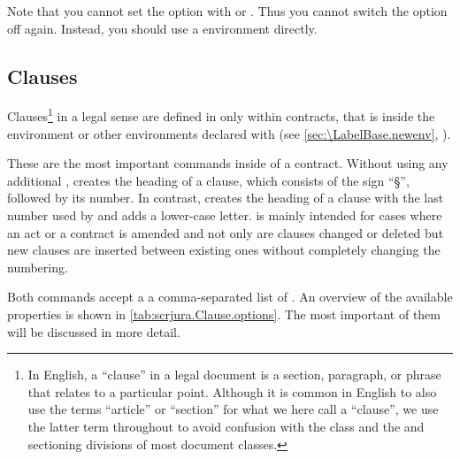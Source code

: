 Note that you cannot set the  option
with  or
. Thus you cannot switch the option off
again. Instead, you should use a  environment
directly.%
\EndIndexGroup


\subsection{Clauses}
\label{sec:scrjura.clause}

Clauses\footnote{%
  In English, a ``clause'' in a legal document is a section, paragraph, or
  phrase that relates to a particular point. Although it is common in English
  to also use the terms ``article'' or ``section'' for what we here call a
  ``clause'', we use the latter term throughout to avoid confusion with the
   class and the  and
   sectioning divisions of most document
  classes.} in a legal sense are defined in  only within
contracts, that is inside the  environment or
other environments declared with
 (see
\autoref{sec:\LabelBase.newenv},
).

\begin{Declaration}
\end{Declaration}
These are the most important commands inside of a contract. Without using any
additional ,  creates the heading of a clause,
which consists of the sign ``\S'', followed by its number. In contrast,
 creates the heading of a clause with the last number used by
 and adds a lower-case letter.  is mainly
intended for cases where an act or a contract is amended and not only are
clauses changed or deleted but new clauses are inserted between existing ones
without completely changing the numbering.

Both commands accept a a comma-separated list of . An overview
of the available properties is shown in \autoref{tab:scrjura.Clause.options}.
The most important of them will be discussed in more detail.

